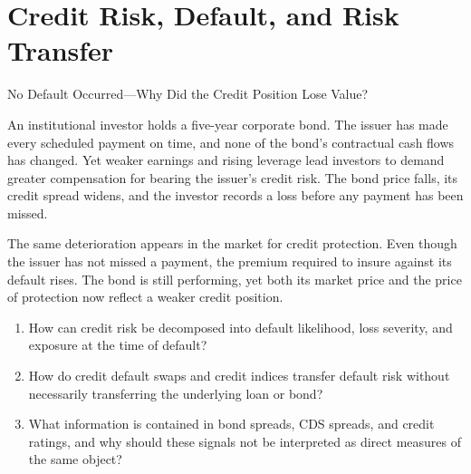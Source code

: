 \chapter{Credit Risk, Default, and Risk Transfer}
\label{chap:Credit_Risk_Default_and_Risk_Transfer}

\begin{openingcase}{No Default Occurred---Why Did the Credit Position Lose Value?}

An institutional investor holds a five-year corporate bond. The issuer has made every scheduled payment on time, and none of the bond's contractual cash flows has changed. Yet weaker earnings and rising leverage lead investors to demand greater compensation for bearing the issuer's credit risk. The bond price falls, its credit spread widens, and the investor records a loss before any payment has been missed.

The same deterioration appears in the market for credit protection. Even though the issuer has not missed a payment, the premium required to insure against its default rises. The bond is still performing, yet both its market price and the price of protection now reflect a weaker credit position.

\end{openingcase}


\begin{tcolorbox}[
  enhanced,
  colback=FinanceBlue!6,
  colframe=FinanceBlue,
  boxrule=0.6pt,
  sharp corners,
  left=8pt,
  right=8pt,
  top=7pt,
  bottom=7pt,
  before skip=1em,
  after skip=1.6em,
  title=\textbf{Core Questions},
  coltitle=white,
  colbacktitle=FinanceBlue,
  fonttitle=\bfseries,
  attach boxed title to top left={xshift=6pt,yshift=-2mm},
  boxed title style={
    boxrule=0pt,
    sharp corners,
    left=5pt,
    right=5pt,
    top=2pt,
    bottom=2pt
  }
]
\begin{enumerate}[
  leftmargin=*,
  label=\textcolor{FinanceBlue}{\textbf{\arabic*.}},
  itemsep=0.55em,
  topsep=0.2em
]


\item How can credit risk be decomposed into default likelihood, loss severity, and exposure at the time of default?

\item How do credit default swaps and credit indices transfer default risk without necessarily transferring the underlying loan or bond?

\item What information is contained in bond spreads, CDS spreads, and credit ratings, and why should these signals not be interpreted as direct measures of the same object?


\end{enumerate}
\end{tcolorbox}


